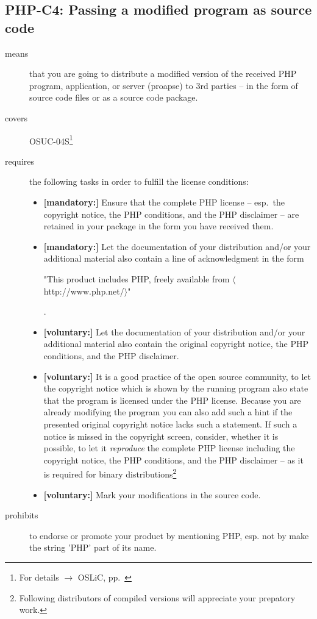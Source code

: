 \subsection{PHP-C4: Passing a modified program as source code}
\label{OSUC-04S-PHP}

\begin{description}
\item[means] that you are going to distribute a modified version of the received
PHP program, application, or server (proapse) to 3rd parties -- in the form of
source code files or as a source code package.
\item[covers] OSUC-04S\footnote{For details $\rightarrow$ OSLiC, pp.\
\pageref{OSUC-04S-DEF}}
\item[requires] the following tasks in order to fulfill the license conditions:
\begin{itemize}

  \item \textbf{[mandatory:]} Ensure that the complete PHP license -- esp.\
  the copyright notice, the PHP conditions, and the PHP disclaimer -- are
  retained in your package in the form you have received them.
  
  \item \textbf{[mandatory:]} Let the documentation of your distribution and/or
  your additional material also contain a line of acknowledgment in the form
  \begin{footnotesize}"This product includes PHP, freely available from
  $\langle$http://www.php.net/$\rangle$"\end{footnotesize}.
    
  \item \textbf{[voluntary:]} Let the documentation of your distribution and/or
  your additional material also contain the original copyright notice, the PHP
  conditions, and the PHP disclaimer.
     
  \item \textbf{[voluntary:]} It is a good practice of the open source
  community, to let the copyright notice which is shown by the running program
  also state that the program is licensed under the PHP license. Because you are
  already modifying the program you can also add such a hint if the presented
  original copyright notice lacks such a statement. If such a notice is missed
  in the copyright screen, consider, whether it is possible, to let it
  \emph{reproduce} the complete PHP license including the copyright notice, the
  PHP conditions, and the PHP disclaimer -- as it is required for binary
  distributions\footnote{Following distributors of compiled versions will
  appreciate your prepatory work.}
  
  \item \textbf{[voluntary:]} Mark your modifications in the source code.
  
  
\end{itemize}

\item[prohibits] to endorse or promote your product by mentioning PHP, esp. not
by make the string 'PHP' part of its name.

\end{description}

